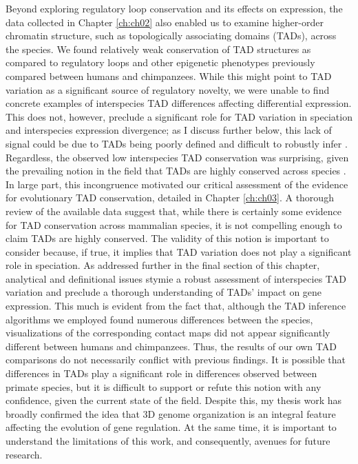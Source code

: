 Beyond exploring regulatory loop conservation and its effects on expression, the data collected in Chapter \ref{ch:ch02} also enabled us to examine higher-order chromatin structure, such as topologically associating domains (TADs), across the species. We found relatively weak conservation of TAD structures as compared to regulatory loops and other epigenetic phenotypes previously compared between humans and chimpanzees. While this might point to TAD variation as a significant source of regulatory novelty, we were unable to find concrete examples of interspecies TAD differences affecting differential expression. This does not, however, preclude a significant role for TAD variation in speciation and interspecies expression divergence; as I discuss further below, this lack of signal could be due to TADs being poorly defined and difficult to robustly infer \cite{Dali.2017}. Regardless, the observed low interspecies TAD conservation was surprising, given the prevailing notion in the field that TADs are highly conserved across species \cite{Dixon.2012, Rao.2014}. In large part, this incongruence motivated our critical assessment of the evidence for evolutionary TAD conservation, detailed in Chapter \ref{ch:ch03}. A thorough review of the available data suggest that, while there is certainly some evidence for TAD conservation across mammalian species, it is not compelling enough to claim TADs are highly conserved. The validity of this notion is important to consider because, if true, it implies that TAD variation does not play a significant role in speciation. As addressed further in the final section of this chapter, analytical and definitional issues stymie a robust assessment of interspecies TAD variation and preclude a thorough understanding of TADs' impact on gene expression. This much is evident from the fact that, although the TAD inference algorithms we employed found numerous differences between the species, visualizations of the corresponding contact maps did not appear significantly different between humans and chimpanzees. Thus, the results of our own TAD comparisons do not necessarily conflict with previous findings. It is possible that differences in TADs play a significant role in differences observed between primate species, but it is difficult to support or refute this notion with any confidence, given the current state of the field. Despite this, my thesis work has broadly confirmed the idea that 3D genome organization is an integral feature affecting the evolution of gene regulation. At the same time, it is important to understand the limitations of this work, and consequently, avenues for future research.

